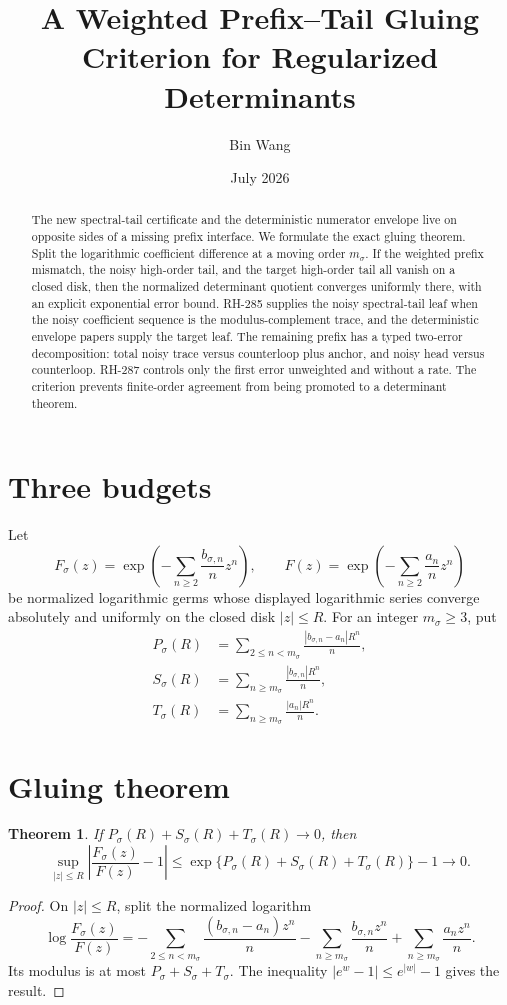 \documentclass[11pt]{article}
\title{A Weighted Prefix--Tail Gluing Criterion for Regularized Determinants}
\author{Bin Wang}\date{July 2026}
\newtheorem{theorem}{Theorem}[section]
\theoremstyle{remark}\newtheorem{remark}[theorem]{Remark}
\begin{document}
\maketitle
\begin{abstract}
The new spectral-tail certificate and the deterministic numerator envelope
live on opposite sides of a missing prefix interface.  We formulate the
exact gluing theorem.  Split the logarithmic coefficient difference at a
moving order $m_\sigma$.  If the weighted prefix mismatch, the noisy
high-order tail, and the target high-order tail all vanish on a closed disk,
then the normalized determinant quotient converges uniformly there, with an
explicit exponential error bound.  RH-285 supplies the noisy spectral-tail
leaf when the noisy coefficient sequence is the modulus-complement trace,
and the deterministic envelope papers supply the target leaf.  The remaining
prefix has a typed two-error decomposition: total noisy trace versus
counterloop plus anchor, and noisy head versus counterloop.  RH-287 controls
only the first error unweighted and without a rate.  The criterion prevents
finite-order agreement from being promoted to a determinant theorem.
\end{abstract}

\section{Three budgets}
Let
\[
 F_\sigma(z)=\exp\left(-\sum_{n\ge2}\frac{b_{\sigma,n}}n z^n\right),
 \qquad
 F(z)=\exp\left(-\sum_{n\ge2}\frac{a_n}n z^n\right)
\]
be normalized logarithmic germs whose displayed logarithmic series converge
absolutely and uniformly on the closed disk $|z|\le R$.
For an integer $m_\sigma\ge3$, put
\begin{align*}
 P_\sigma(R)&=\sum_{2\le n<m_\sigma}
 \frac{|b_{\sigma,n}-a_n|R^n}{n},\\
 S_\sigma(R)&=\sum_{n\ge m_\sigma}
 \frac{|b_{\sigma,n}|R^n}{n},\\
 T_\sigma(R)&=\sum_{n\ge m_\sigma}
 \frac{|a_n|R^n}{n}.
\end{align*}

\section{Gluing theorem}
\begin{theorem}\label{thm:gluing}
If $P_\sigma(R)+S_\sigma(R)+T_\sigma(R)\to0$, then
\[
 \sup_{|z|\le R}\left|\frac{F_\sigma(z)}{F(z)}-1\right|
 \le
 \exp\{P_\sigma(R)+S_\sigma(R)+T_\sigma(R)\}-1
 \longrightarrow0.
\]
\end{theorem}
\begin{proof}
On $|z|\le R$, split the normalized logarithm
\[
 \log\frac{F_\sigma(z)}{F(z)}
 =-\sum_{2\le n<m_\sigma}\frac{(b_{\sigma,n}-a_n)z^n}{n}
  -\sum_{n\ge m_\sigma}\frac{b_{\sigma,n}z^n}{n}
  +\sum_{n\ge m_\sigma}\frac{a_nz^n}{n}.
\]
Its modulus is at most $P_\sigma+S_\sigma+T_\sigma$.  The inequality
$|e^w-1|\le e^{|w|}-1$ gives the result.
\end{proof}
\end{document}
